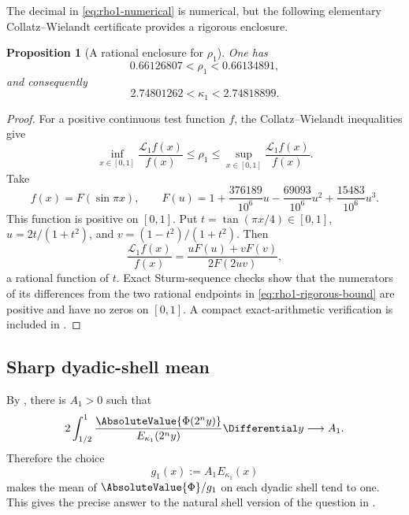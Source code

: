 \documentclass[11pt,oneside]{article}
\newtheorem{proposition}[theorem]{Proposition}
\theoremstyle{definition}
\theoremstyle{remark}
\newcommand{\Phiup}{\Phi}
\begin{document}
The decimal in \eqref{eq:rho1-numerical} is numerical, but the following elementary
Collatz--Wielandt certificate provides a rigorous enclosure.

\begin{proposition}[A rational enclosure for $\rho_1$]
\label{prop:rho1-rigorous-bound}
One has
\begin{equation}
 0.66126807<\rho_1<0.66134891,
 \label{eq:rho1-rigorous-bound}
\end{equation}
and consequently
\begin{equation}
 2.74801262<\kappa_1<2.74818899.
 \label{eq:kappa1-rigorous-bound}
\end{equation}
\end{proposition}

\begin{proof}
For a positive continuous test function $f$, the Collatz--Wielandt inequalities give
\[
 \inf_{x\in[0,1]}\frac{\mathcal L_1f(x)}{f(x)}
 \le\rho_1\le
 \sup_{x\in[0,1]}\frac{\mathcal L_1f(x)}{f(x)}.
\]
Take
\[
 f(x)=F(\sin\pi x),\qquad
 F(u)=1+\frac{376189}{10^6}u-\frac{69093}{10^6}u^2
       +\frac{15483}{10^6}u^3.
\]
This function is positive on $[0,1]$.  Put $t=\tan(\pi x/4)\in[0,1]$,
$u=2t/(1+t^2)$, and $v=(1-t^2)/(1+t^2)$.  Then
\[
 \frac{\mathcal L_1f(x)}{f(x)}
 =\frac{uF(u)+vF(v)}{2F(2uv)},
\]
a rational function of $t$.  Exact Sturm-sequence checks show that the numerators of its
differences from the two rational endpoints in \eqref{eq:rho1-rigorous-bound} are positive
and have no zeros on $[0,1]$.  A compact exact-arithmetic verification is included in
.
\end{proof}

\subsection{Sharp dyadic-shell mean}

By , there is $A_1>0$ such that
\begin{equation}
 2\int_{1/2}^{1}
 \frac{\AbsoluteValue{\Phiup(2^ny)}}{E_{\kappa_1}(2^ny)}\Differential y
 \longrightarrow A_1.
 \label{eq:L1-shell-mean}
\end{equation}
Therefore the choice
\begin{equation}
 g_1(x):=A_1E_{\kappa_1}(x)
 \label{eq:g1}
\end{equation}
makes the mean of $\AbsoluteValue{\Phiup}/g_1$ on each dyadic shell tend to one.  This gives the
precise answer to the natural shell version of the question in \cite{mse-decay}.
\end{document}
